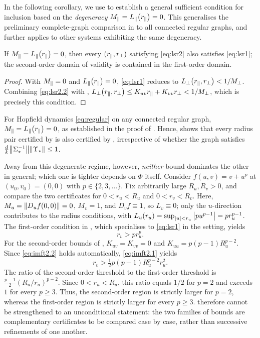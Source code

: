 \documentclass[a4paper]{cas-dc}
\begin{document}
In the following corollary, we use  to establish a general sufficient condition for inclusion based on the \emph{degeneracy} \(M_{\parallel}=L_{\parallel}\bigl(r_{\parallel}\bigr)=0\). This generalises the preliminary complete-graph comparison in  to all connected regular graphs, and further applies to other systems exhibiting the same degeneracy.

\begin{corollary}
    \label{cor:degenerate}
    If \(M_{\parallel}=L_{\parallel}\bigl(r_{\parallel}\bigr)=0\), then every \((r_{\parallel},r_{\perp})\) satisfying \eqref{eq:lsr2} also satisfies \eqref{eq:lsr1}; the second-order domain of validity is contained in the first-order domain.
\end{corollary}
\begin{proof}
    With \(M_{\parallel}=0\) and \(L_{\parallel}\bigl(r_{\parallel}\bigr)=0\), \eqref{eq:lsr1} reduces to \(L_{\perp}\bigl(r_{\parallel},r_{\perp}\bigr)<1/M_{\perp}\). Combining \eqref{eq:lsr2.2} with , \(L_{\perp}\bigl(r_{\parallel},r_{\perp}\bigr) \le K_{uv}r_{\parallel}+K_{vv}r_{\perp} < 1/M_{\perp}\), which is precisely this condition.
\end{proof}

For Hopfield dynamics \eqref{eq:regular} on any connected regular graph, \(M_{\parallel}=L_{\parallel}\bigl(r_{\parallel}\bigr)=0\), as established in the proof of . Hence,  shows that every radius pair certified by  is also certified by , irrespective of whether the graph satisfies \(\frac{d}{k}\norm{\Sigma_{\star }^{-1}}\norm{\Upsilon_{\star }} \le 1\).

Away from this degenerate regime, however, \emph{neither} bound dominates the other in general; which one is tighter depends on \(\Phi\) itself. Consider \(f(u,v)=v+u^{p}\) at \((u_0,v_0)=(0,0)\) with \(p\in\{2,3,\dots\}\). Fix arbitrarily large \(R_u,R_v>0\), and compare the two certificates for \(0<r_u<R_u\) and \(0<r_v<R_v\). Here, \(M_u=\norm{D_uf(0,0)}=0\), \(M_v=1\), and \(D_vf\equiv1\), so \(L_v\equiv0\); only the \(u\)-direction contributes to the radius conditions, with \(L_u(r_u)=\sup_{\abs{u}<r_u}\abs{pu^{p-1}}=pr_u^{p-1}\). The first-order condition in \cite[Corollary~3.8]{jindal2024estimates}, which specialises to \eqref{eq:lsr1} in the \LSR{} setting, yields
\begin{equation}
    r_v>pr_u^p. \label{eq:counter1}
\end{equation}
For the second-order bounds of , \(K_{uv}=K_{vv}=0\) and \(K_{uu}=p(p-1)R_u^{p-2}\). Since \eqref{eq:imft2.2} holds automatically, \eqref{eq:imft2.1} yields
\begin{equation}
    r_v>\tfrac12p(p-1)R_u^{p-2}r_u^2. \label{eq:counter2}
\end{equation}
The ratio of the second-order threshold to the first-order threshold is \(\tfrac{p-1}{2}(R_u/r_u)^{p-2}\). Since \(0<r_u<R_u\), this ratio equals \(1/2\) for \(p=2\) and exceeds \(1\) for every \(p\ge3\). Thus, the second-order region is strictly larger for \(p=2\), whereas the first-order region is strictly larger for every \(p\ge3\).  therefore cannot be strengthened to an unconditional statement: the two families of bounds are complementary certificates to be compared case by case, rather than successive refinements of one another.
\end{document}
